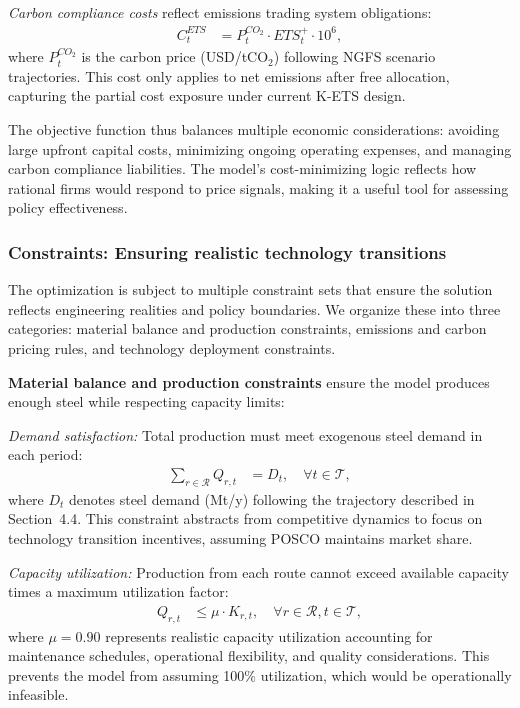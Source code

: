 \textit{Carbon compliance costs} reflect emissions trading system obligations:
\begin{align}
C^{ETS}_t &= P^{CO_2}_t \cdot ETS_t^+ \cdot 10^6, \label{eq:ets}
\end{align}
where $P^{CO_2}_t$ is the carbon price (USD/tCO$_2$) following NGFS scenario trajectories. This cost only applies to net emissions after free allocation, capturing the partial cost exposure under current K-ETS design.

The objective function thus balances multiple economic considerations: avoiding large upfront capital costs, minimizing ongoing operating expenses, and managing carbon compliance liabilities. The model's cost-minimizing logic reflects how rational firms would respond to price signals, making it a useful tool for assessing policy effectiveness.

\subsubsection{Constraints: Ensuring realistic technology transitions}

The optimization is subject to multiple constraint sets that ensure the solution reflects engineering realities and policy boundaries. We organize these into three categories: material balance and production constraints, emissions and carbon pricing rules, and technology deployment constraints.

\textbf{Material balance and production constraints} ensure the model produces enough steel while respecting capacity limits:

\textit{Demand satisfaction:} Total production must meet exogenous steel demand in each period:
\begin{align}
\sum_{r \in \mathcal{R}} Q_{r,t} &= D_t, \quad \forall t \in \mathcal{T}, \label{eq:demand}
\end{align}
where $D_t$ denotes steel demand (Mt/y) following the trajectory described in Section~4.4. This constraint abstracts from competitive dynamics to focus on technology transition incentives, assuming POSCO maintains market share.

\textit{Capacity utilization:} Production from each route cannot exceed available capacity times a maximum utilization factor:
\begin{align}
Q_{r,t} &\le \mu \cdot K_{r,t}, \quad \forall r \in \mathcal{R}, t \in \mathcal{T}, \label{eq:utilization}
\end{align}
where $\mu = 0.90$ represents realistic capacity utilization accounting for maintenance schedules, operational flexibility, and quality considerations. This prevents the model from assuming 100\% utilization, which would be operationally infeasible.

